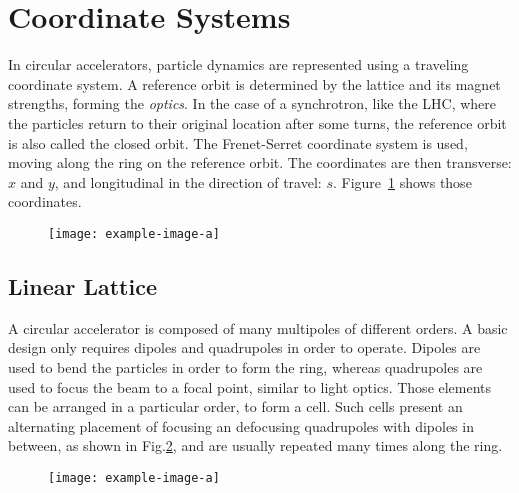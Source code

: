 \section{Coordinate Systems}

In circular accelerators, particle dynamics are represented using a traveling coordinate system.
A reference orbit is determined by the lattice and its magnet strengths, forming the
\textit{optics}. In the case of a synchrotron, like the LHC, where the particles return to their
original location after some turns, the reference orbit is also called the closed orbit.  
The Frenet-Serret coordinate system is used, moving along the ring on the reference orbit. The
coordinates are then transverse: $x$ and $y$, and longitudinal in the direction of travel: $s$.
Figure~\ref{fig:coordinate_systems:frenet_serret} shows those coordinates.

\begin{figure}[H]
    \centering
    \texttt{[image: example-image-a]}
    \caption{}
    \label{fig:coordinate_systems:frenet_serret}
\end{figure}



\subsection{Linear Lattice}

A circular accelerator is composed of many multipoles of different orders. A basic
design only requires dipoles and quadrupoles in order to operate. Dipoles are used to bend the
particles in order to form the ring, whereas quadrupoles are used to focus the beam to a focal
point, similar to light optics.
Those elements can be arranged in a particular order, to form a  cell. Such cells present
an alternating placement of focusing an defocusing quadrupoles with dipoles in between, as shown in
Fig.\ref{fig:coordinate_systems:fodo}, and are usually repeated many times along the ring.

\begin{figure}[H]
    \centering
    \texttt{[image: example-image-a]}
    \caption{}
    \label{fig:coordinate_systems:fodo}
\end{figure}


